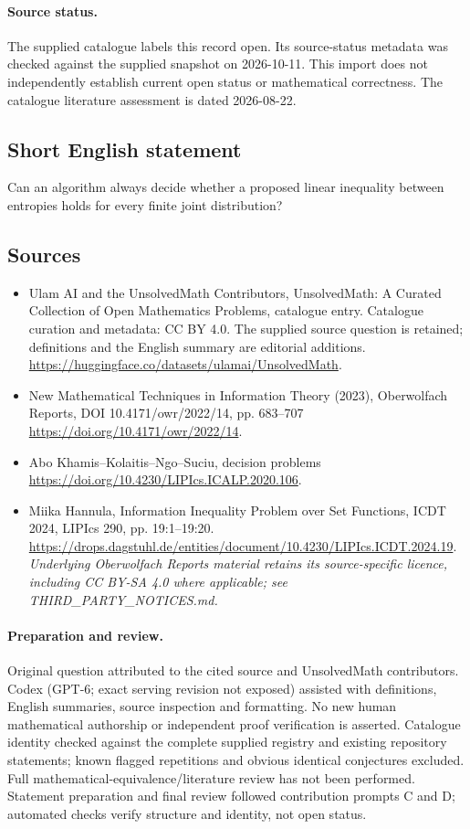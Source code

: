 \documentclass[11pt]{article}
\begin{document}
\paragraph{Source status.}
The supplied catalogue labels this record open. Its source-status metadata was checked against the supplied snapshot on 2026-10-11. This import does not independently establish current open status or mathematical correctness. The catalogue literature assessment is dated 2026-08-22.
\subsection{Short English statement}
Can an algorithm always decide whether a proposed linear inequality between entropies holds for every finite joint distribution?
\subsection{Sources}
\begin{itemize}
\item[S1] Ulam AI and the UnsolvedMath Contributors, UnsolvedMath: A Curated Collection of Open Mathematics Problems, catalogue entry. Catalogue curation and metadata: CC BY 4.0. The supplied source question is retained; definitions and the English summary are editorial additions.
\url{https://huggingface.co/datasets/ulamai/UnsolvedMath}.
\item[S2] New Mathematical Techniques in Information Theory (2023), Oberwolfach Reports, DOI 10.4171/owr/2022/14, pp. 683--707
\url{https://doi.org/10.4171/owr/2022/14}.
\item[S3] Abo Khamis--Kolaitis--Ngo--Suciu, decision problems
\url{https://doi.org/10.4230/LIPIcs.ICALP.2020.106}.
\item[S4] Miika Hannula, Information Inequality Problem over Set Functions, ICDT 2024, LIPIcs 290, pp. 19:1--19:20.
\url{https://drops.dagstuhl.de/entities/document/10.4230/LIPIcs.ICDT.2024.19}.
\textit{Underlying Oberwolfach Reports material retains its source-specific licence, including CC BY-SA 4.0 where applicable; see THIRD\_PARTY\_NOTICES.md.}
\end{itemize}
\paragraph{Preparation and review.}
Original question attributed to the cited source and UnsolvedMath contributors. Codex (GPT-6; exact serving revision not exposed) assisted with definitions, English summaries, source inspection and formatting. No new human mathematical authorship or independent proof verification is asserted. Catalogue identity checked against the complete supplied registry and existing repository statements; known flagged repetitions and obvious identical conjectures excluded. Full mathematical-equivalence/literature review has not been performed. Statement preparation and final review followed contribution prompts C and D; automated checks verify structure and identity, not open status.
\label{end:statement}
\end{document}
